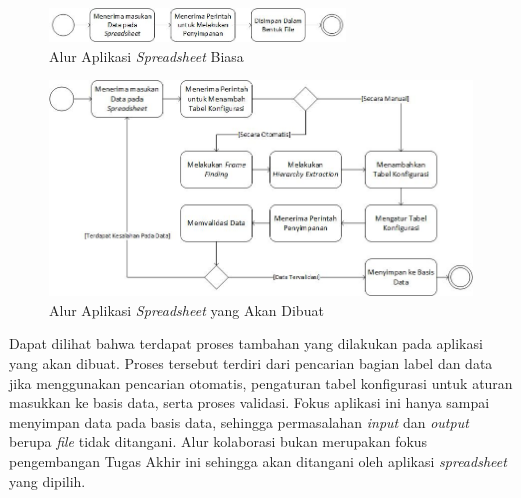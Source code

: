 \begin{figure}[htb]
    \centering
    \includegraphics[width=0.7\textwidth]{resources/chapter-3-workflow-biasa.jpg}
    \caption{Alur Aplikasi \textit{Spreadsheet} Biasa}
	\label{GambarWorkflowBiasa}
\end{figure}

\begin{figure}[htb]
    \centering
    \includegraphics[width=1\textwidth]{resources/chapter-3-workflow.jpg}
    \caption{Alur Aplikasi \textit{Spreadsheet} yang Akan Dibuat}
	\label{GambarWorkflow}
\end{figure}

Dapat dilihat bahwa terdapat proses tambahan yang dilakukan pada aplikasi yang akan dibuat. Proses tersebut terdiri dari pencarian bagian label dan data jika menggunakan pencarian otomatis, pengaturan tabel konfigurasi untuk aturan masukkan ke basis data, serta proses validasi. Fokus aplikasi ini hanya sampai menyimpan data pada basis data, sehingga permasalahan \textit{input} dan \textit{output} berupa \textit{file} tidak ditangani. Alur kolaborasi bukan merupakan fokus pengembangan Tugas Akhir ini sehingga akan ditangani oleh aplikasi \textit{spreadsheet} yang dipilih.

